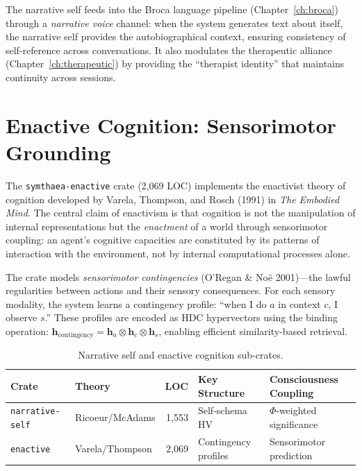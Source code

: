 \documentclass[12pt]{book}
\newcommand{\bind}{\otimes}
\begin{document}
The narrative self feeds into the Broca language pipeline (Chapter~\ref{ch:broca}) through a \textit{narrative voice} channel: when the system generates text about itself, the narrative self provides the autobiographical context, ensuring consistency of self-reference across conversations. It also modulates the therapeutic alliance (Chapter~\ref{ch:therapeutic}) by providing the ``therapist identity'' that maintains continuity across sessions.

\section{Enactive Cognition: Sensorimotor Grounding}

The \texttt{symthaea-enactive} crate (2,069 LOC) implements the enactivist theory of cognition developed by Varela, Thompson, and Rosch (1991) in \textit{The Embodied Mind}. The central claim of enactivism is that cognition is not the manipulation of internal representations but the \textit{enactment} of a world through sensorimotor coupling: an agent's cognitive capacities are constituted by its patterns of interaction with the environment, not by internal computational processes alone.

The crate models \textit{sensorimotor contingencies} (O'Regan \& No\"{e} 2001)---the lawful regularities between actions and their sensory consequences. For each sensory modality, the system learns a contingency profile: ``when I do $a$ in context $c$, I observe $s$.'' These profiles are encoded as HDC hypervectors using the binding operation: $\mathbf{h}_{\text{contingency}} = \mathbf{h}_a \bind \mathbf{h}_c \bind \mathbf{h}_s$, enabling efficient similarity-based retrieval.

\begin{table}[htbp]
\centering
\caption{Narrative self and enactive cognition sub-crates.}
\label{tab:narrative-enactive}
\begin{tabular}{llrlp{4cm}}
\toprule
\textbf{Crate} & \textbf{Theory} & \textbf{LOC} & \textbf{Key Structure} & \textbf{Consciousness Coupling} \\
\midrule
\texttt{narrative-self} & Ricoeur/McAdams & 1,553 & Self-schema HV & $\Phi$-weighted significance \\
\texttt{enactive} & Varela/Thompson & 2,069 & Contingency profiles & Sensorimotor prediction \\
\bottomrule
\end{tabular}
\end{table}
\end{document}

